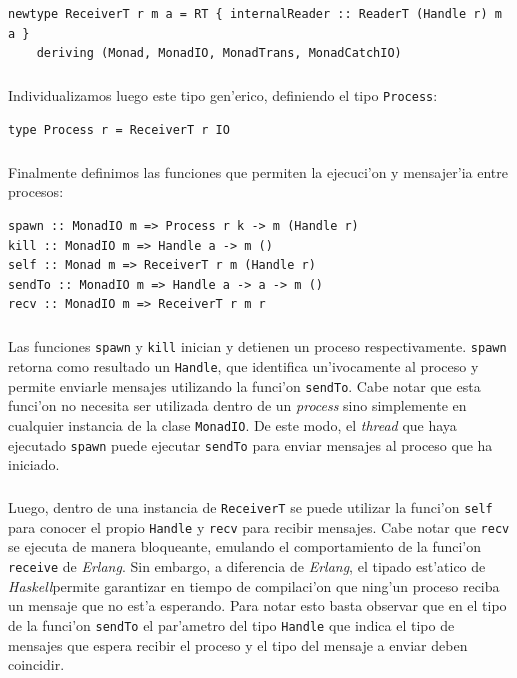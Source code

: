 \documentclass[a4paper]{article}
\newcommand{\haskell}{\textsl{Haskell}}
\begin{document}
\begin{center}\begin{lstlisting}
newtype ReceiverT r m a = RT { internalReader :: ReaderT (Handle r) m a }
    deriving (Monad, MonadIO, MonadTrans, MonadCatchIO)
\end{lstlisting}\end{center}
\subparagraph{}Individualizamos luego este tipo gen'erico, definiendo el tipo \texttt{Process}:
\begin{center}\begin{lstlisting}
type Process r = ReceiverT r IO
\end{lstlisting}\end{center}
\subparagraph{}Finalmente definimos las funciones que permiten la ejecuci'on y mensajer'ia entre procesos:
\begin{center}\begin{lstlisting}
spawn :: MonadIO m => Process r k -> m (Handle r)
kill :: MonadIO m => Handle a -> m ()
self :: Monad m => ReceiverT r m (Handle r)
sendTo :: MonadIO m => Handle a -> a -> m ()
recv :: MonadIO m => ReceiverT r m r
\end{lstlisting}\end{center}
\subparagraph{}Las funciones \texttt{spawn} y \texttt{kill} inician y detienen un proceso respectivamente.  \texttt{spawn} retorna como resultado un \texttt{Handle}, que identifica un'ivocamente al proceso y permite enviarle mensajes utilizando la funci'on \texttt{sendTo}.  Cabe notar que esta funci'on no necesita ser utilizada dentro de un \textsl{process} sino simplemente en cualquier instancia de la clase \texttt{MonadIO}.  De este modo, el \textsl{thread} que haya ejecutado \texttt{spawn} puede ejecutar \texttt{sendTo} para enviar mensajes al proceso que ha iniciado.
\subparagraph{}Luego, dentro de una instancia de \texttt{ReceiverT} se puede utilizar la funci'on \texttt{self} para conocer el propio \texttt{Handle} y \texttt{recv} para recibir mensajes.  Cabe notar que \texttt{recv} se ejecuta de manera bloqueante, emulando el comportamiento de la funci'on \texttt{receive} de \textsl{Erlang}.  Sin embargo, a diferencia de \textsl{Erlang}, el tipado est'atico de \haskell permite garantizar en tiempo de compilaci'on que ning'un proceso reciba un mensaje que no est'a esperando.   Para notar esto basta observar que en el tipo de la funci'on \texttt{sendTo} el par'ametro del tipo \texttt{Handle} que indica el tipo de mensajes que espera recibir el proceso y el tipo del mensaje a enviar deben coincidir.
\end{document}
